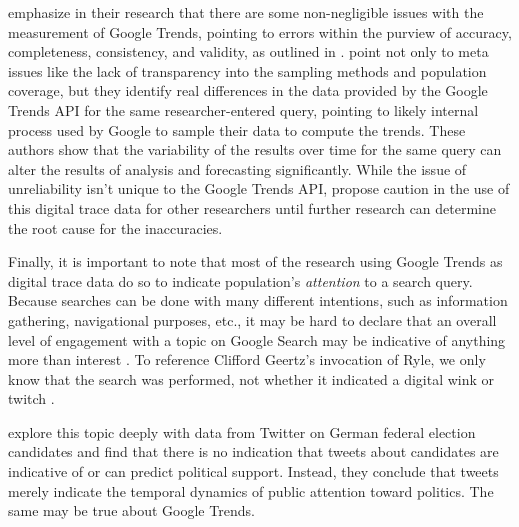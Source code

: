 \citet{cebrian_domenech22} emphasize in their research that there are some 
non-negligible issues with the measurement of Google Trends, pointing to 
errors within the purview of accuracy, completeness, consistency, and validity,
as outlined in \citet{KarrDataQuality}.  
 \citet{cebrian_domenech22} point not only to 
meta issues like the lack of transparency into the sampling methods 
and population coverage, but they identify real differences 
in the data provided by the Google Trends API for the same 
researcher-entered query, pointing to likely internal process 
used by Google to sample their data to compute the trends.
These authors show that the variability of the results over time for the same query
can alter the results of analysis and forecasting significantly. While the 
issue of unreliability isn't unique to the Google Trends API, 
\citet{cebrian_domenech22} propose 
caution in the use of this digital trace data for other researchers until
further research can determine the root cause for the inaccuracies.

Finally, it is important to note that most of the research using 
Google Trends as digital trace data do so to indicate
population's \textit{attention} to a search query. Because
searches can be done with many different intentions, such as 
information gathering, navigational purposes, etc., it may
be hard to declare that an overall level of engagement with a topic
on Google Search may be indicative of anything more than interest \citep{da2011search}.
To reference Clifford Geertz's invocation of Ryle, we only know that the search was 
performed, not whether it indicated a digital wink or twitch \citeyearpar{geertz1973thick}.

\citet{jungherr_etal17} explore this topic deeply with data from
Twitter on German federal election candidates and find that there is no
indication that tweets about candidates are indicative of or can predict 
political support. Instead, they conclude that tweets merely indicate the
temporal dynamics of public attention toward politics. The same may
be true about Google Trends. 

